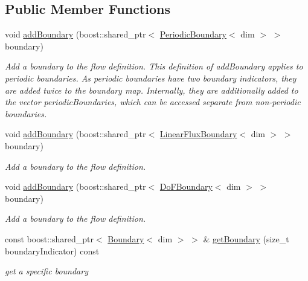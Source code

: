 \subsection*{Public Member Functions}
\begin{DoxyCompactItemize}
\item 
void \hyperlink{classnatrium_1_1BoundaryCollection_a9f957b5338bca01c7bd8c21576ec922c}{addBoundary} (boost::shared\_\-ptr$<$ \hyperlink{classnatrium_1_1PeriodicBoundary}{PeriodicBoundary}$<$ dim $>$ $>$ boundary)
\begin{DoxyCompactList}\small\item\em Add a boundary to the flow definition. This definition of addBoundary applies to periodic boundaries. As periodic boundaries have two boundary indicators, they are added twice to the boundary map. Internally, they are additionally added to the vector periodicBoundaries, which can be accessed separate from non-\/periodic boundaries. \item\end{DoxyCompactList}\item 
void \hyperlink{classnatrium_1_1BoundaryCollection_aa248c47170036538ef052940123b2322}{addBoundary} (boost::shared\_\-ptr$<$ \hyperlink{classnatrium_1_1LinearFluxBoundary}{LinearFluxBoundary}$<$ dim $>$ $>$ boundary)
\begin{DoxyCompactList}\small\item\em Add a boundary to the flow definition. \item\end{DoxyCompactList}\item 
void \hyperlink{classnatrium_1_1BoundaryCollection_aeb04961249e675666c092afd721ad32a}{addBoundary} (boost::shared\_\-ptr$<$ \hyperlink{classnatrium_1_1DoFBoundary}{DoFBoundary}$<$ dim $>$ $>$ boundary)
\begin{DoxyCompactList}\small\item\em Add a boundary to the flow definition. \item\end{DoxyCompactList}\item 
const boost::shared\_\-ptr$<$ \hyperlink{classnatrium_1_1Boundary}{Boundary}$<$ dim $>$ $>$ \& \hyperlink{classnatrium_1_1BoundaryCollection_a44816fa48b8100fb37b8ad7491c2cc6c}{getBoundary} (size\_\-t boundaryIndicator) const 
\begin{DoxyCompactList}\small\item\em get a specific boundary \item\end{DoxyCompactList}\item 

\end{DoxyCompactItemize}
